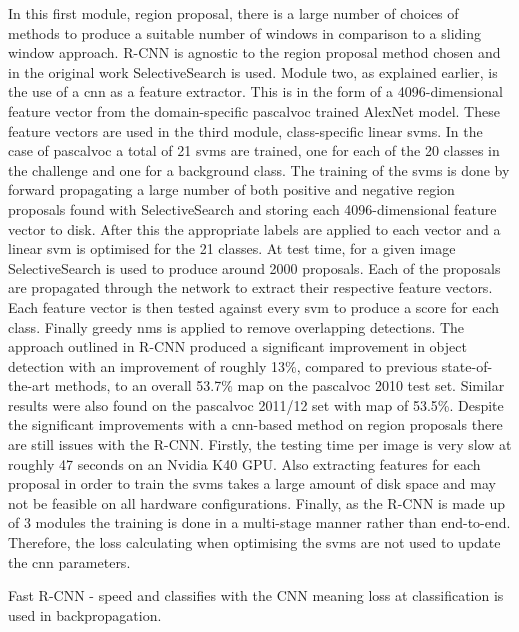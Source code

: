 In this first module, region proposal, there is a large number of choices of methods to produce a suitable number of windows in comparison to a sliding window approach. R-CNN is agnostic to the region proposal method chosen and in the original work SelectiveSearch \cite{selectivesearch} is used. Module two, as explained earlier, is the use of a \gls{cnn} as a feature extractor. This is in the form of a 4096-dimensional feature vector from the domain-specific \gls{pascalvoc} trained AlexNet model. These feature vectors are used in the third module, class-specific linear \glspl{svm}. In the case of \gls{pascalvoc} a total of 21 \glspl{svm} are trained, one for each of the 20 classes in the challenge and one for a background class. The training of the \glspl{svm} is done by forward propagating a large number of both positive and negative region proposals found with SelectiveSearch and storing each 4096-dimensional feature vector to disk. After this the appropriate labels are applied to each vector and a linear \gls{svm} is optimised for the 21 classes. At test time, for a given image SelectiveSearch is used to produce around 2000 proposals. Each of the proposals are propagated through the network to extract their respective feature vectors. Each feature vector is then tested against every \gls{svm} to produce a score for each class. Finally greedy \gls{nms} is applied to remove overlapping detections. The approach outlined in R-CNN produced a significant improvement in object detection with an improvement of roughly 13\%, compared to previous state-of-the-art methods, to an overall 53.7\% \gls{map} on the \gls{pascalvoc} 2010 test set. Similar results were also found on the \gls{pascalvoc} 2011/12 set with \gls{map} of 53.5\%. Despite the significant improvements with a \gls{cnn}-based method on region proposals there are still issues with the R-CNN. Firstly, the testing time per image is very slow at roughly 47 seconds on an Nvidia K40 GPU. Also extracting features for each proposal in order to train the \glspl{svm} takes a large amount of disk space and may not be feasible on all hardware configurations. Finally, as the R-CNN is made up of 3 modules the training is done in a multi-stage manner rather than end-to-end. Therefore, the loss calculating when optimising the \glspl{svm} are not used to update the \gls{cnn} parameters.

Fast R-CNN - speed and classifies with the CNN meaning loss at classification is used in backpropagation.